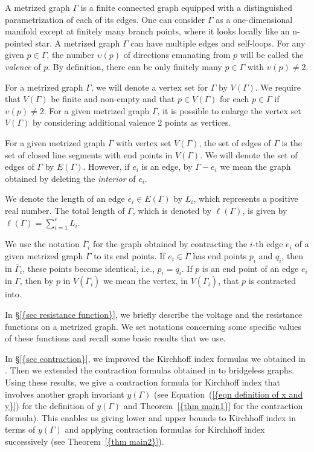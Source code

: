 \documentclass[12pt]{amsart}
\theoremstyle{example}
\theoremstyle{definition}
\theoremstyle{notation}
\begin{document}
A metrized graph ${\Gamma}$ is a finite connected graph equipped with a distinguished parametrization of each of its edges.
One can consider ${\Gamma}$ as a one-dimensional manifold except at finitely
many branch points, where it looks locally like an n-pointed star.
A metrized graph ${\Gamma}$ can have multiple edges and self-loops.
For any given $p \in {\Gamma}$,
the number ${\upsilon}(p)$ of directions emanating from $p$ will be called the \textit{valence} of $p$.
By definition, there can be only finitely many $p \in {\Gamma}$ with ${\upsilon}(p)\not=2$.

For a metrized graph ${\Gamma}$, we will denote a vertex set for ${\Gamma}$ by ${V({\Gamma})}$.
We require that ${V({\Gamma})}$ be finite and non-empty and that $p \in {V({\Gamma})}$ for each $p \in {\Gamma}$ if ${\upsilon}(p)\not=2$. For a given metrized graph ${\Gamma}$, it is possible to enlarge the
vertex set ${V({\Gamma})}$ by considering additional valence $2$ points as vertices.

For a given metrized graph ${\Gamma}$ with vertex set ${V({\Gamma})}$, the set of edges of ${\Gamma}$ is the set of closed line segments with end points in ${V({\Gamma})}$. We will denote the set of edges of ${\Gamma}$ by ${E({\Gamma})}$. However, if
$e_i$ is an edge, by ${\Gamma}-e_i$ we mean the graph obtained by deleting the {\em interior} of $e_i$.

We denote the length of an edge $e_i \in {E({\Gamma})}$ by ${L_{i}}$, which represents a positive real number. The total length of ${\Gamma}$, which is denoted by ${\ell ({\Gamma})}$, is given by ${\ell ({\Gamma})}=\sum_{i=1}^e{L_{i}}$.

We use the notation ${{\overline{\Gamma}}}_i$ for the graph obtained by contracting the $i$-th edge
$e_{i}$ of a given metrized graph ${\Gamma}$ to its end
points. If $e_{i} \in {\Gamma}$ has end points ${p_{i}}$ and ${q_{i}}$, then in
${{\overline{\Gamma}}}_i$, these points become identical, i.e., ${p_{i}}={q_{i}}$.
If $p$ is an end point of an edge $e_i$ in ${\Gamma}$, then by $p$ in ${V({{{\overline{\Gamma}}}_i})}$ we mean the
vertex, in ${V({{{\overline{\Gamma}}}_i})}$, that $p$ is contracted into.

In {\S\ref{{sec resistance function}}}, we briefly describe the voltage and the resistance functions on a metrized graph. We set notations concerning some specific values of these functions and recall some basic results that we use.

In {\S\ref{{sec contraction}}}, we improved the Kirchhoff index formulas we obtained in \cite{C6}. Then
we extended the contraction formulas obtained in \cite{C5} to bridgeless graphs. Using these results, we give a contraction formula for Kirchhoff index that involves another graph invariant $y({\Gamma})$ (see {Equation~(\ref{{eqn definition of x and y}})} for the definition of $y({\Gamma})$ and {Theorem~\ref{{thm main1}}} for the contraction formula). This enables us giving lower and upper bounds to Kirchhoff index in terms of $y({\Gamma})$ and applying contraction formulas for Kirchhoff index successively (see {Theorem~\ref{{thm main2}}}).
\end{document}
